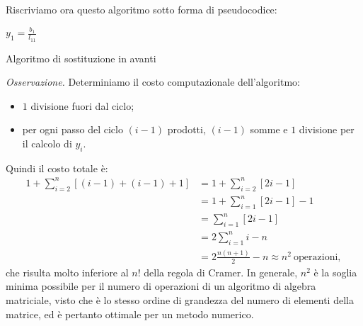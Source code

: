 Riscriviamo ora questo algoritmo sotto forma di pseudocodice:

\begin{algo}
    $y_{1} = \frac{b_{1} }{l_{11} }  $\;
    \caption{Algoritmo di sostituzione in avanti}
\end{algo}

\textit{Osservazione.} Determiniamo il costo computazionale dell'algoritmo:
\begin{itemize}
\item $1$ divisione fuori dal ciclo;
\item per ogni passo del ciclo $( i-1)$ prodotti, $( i-1)$ somme e $1$ divisione per il calcolo di $y_{i}$.
\end{itemize}

Quindi il costo totale è:
\begin{align*}
  1+\sum ^{n}_{i=2}[( i-1) +( i-1) +1] &= 1+\sum ^{n}_{i=2}[ 2i-1]\\
 &= 1+\sum ^{n}_{i=1}[ 2i-1] -1 \\
 &= \sum ^{n}_{i=1}[ 2i-1]\\
 &= 2\sum ^{n}_{i=1} i-n\\
 &= 2\frac{n( n+1)}{2} -n \approx n^{2} \ \text{operazioni},
\end{align*}
che risulta molto inferiore al $n!$ della regola di Cramer.
In generale, $n^2$ è la soglia minima possibile per il numero di operazioni di un algoritmo di algebra matriciale, visto che è lo stesso ordine di grandezza del numero di elementi della matrice, ed è pertanto ottimale per un metodo numerico.

